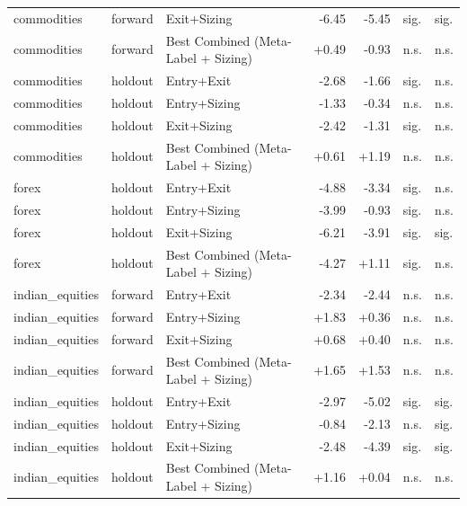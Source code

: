 \begin{longtable}{l l l r r l l}
commodities & forward & Exit+Sizing & -6.45 & -5.45 & sig. & sig. \\
commodities & forward & Best Combined (Meta-Label + Sizing) & +0.49 & -0.93 & n.s. & n.s. \\
commodities & holdout & Entry+Exit & -2.68 & -1.66 & sig. & n.s. \\
commodities & holdout & Entry+Sizing & -1.33 & -0.34 & n.s. & n.s. \\
commodities & holdout & Exit+Sizing & -2.42 & -1.31 & sig. & n.s. \\
commodities & holdout & Best Combined (Meta-Label + Sizing) & +0.61 & +1.19 & n.s. & n.s. \\
forex & holdout & Entry+Exit & -4.88 & -3.34 & sig. & n.s. \\
forex & holdout & Entry+Sizing & -3.99 & -0.93 & sig. & n.s. \\
forex & holdout & Exit+Sizing & -6.21 & -3.91 & sig. & sig. \\
forex & holdout & Best Combined (Meta-Label + Sizing) & -4.27 & +1.11 & sig. & n.s. \\
indian\_equities & forward & Entry+Exit & -2.34 & -2.44 & n.s. & n.s. \\
indian\_equities & forward & Entry+Sizing & +1.83 & +0.36 & n.s. & n.s. \\
indian\_equities & forward & Exit+Sizing & +0.68 & +0.40 & n.s. & n.s. \\
indian\_equities & forward & Best Combined (Meta-Label + Sizing) & +1.65 & +1.53 & n.s. & n.s. \\
indian\_equities & holdout & Entry+Exit & -2.97 & -5.02 & sig. & sig. \\
indian\_equities & holdout & Entry+Sizing & -0.84 & -2.13 & n.s. & sig. \\
indian\_equities & holdout & Exit+Sizing & -2.48 & -4.39 & sig. & sig. \\
indian\_equities & holdout & Best Combined (Meta-Label + Sizing) & +1.16 & +0.04 & n.s. & n.s. \\
\end{longtable}
